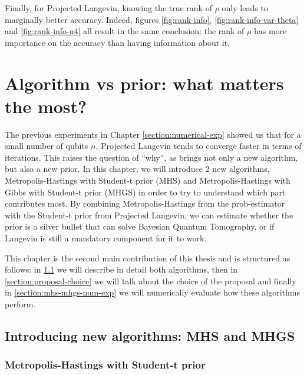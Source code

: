 \documentclass[12pt]{memoir}
\begin{document}
Finally, for Projected Langevin, knowing the true rank of $\rho$ only leads to marginally better accuracy. Indeed, figures \ref{fig:rank-info}, \ref{fig:rank-info-var-theta} and \ref{fig:rank-info-n4} all result in the same conclusion: the rank of $\rho$ has more importance on the accuracy than having information about it.


\chapter{Algorithm vs prior: what matters the most?}\label{section:algo-vs-prior}

The previous experiments in Chapter \ref{section:numerical-exp} showed us that for a small number of qubits $n$, Projected Langevin tends to converge faster in terms of iterations. This raises the question of ``why'', as \cite{meth:bayesian:Langevin:ACMT2024} brings not only a new algorithm, but also a new prior. In this chapter, we will introduce 2 new algorithms, Metropolis-Hastings with Student-t prior (MHS) and Metropolis-Hastings with Gibbs with Student-t prior (MHGS) in order to try to understand which part contributes most. By combining Metropolis-Hastings from the prob-estimator with the Student-t prior from Projected Langevin, we can estimate whether the prior is a silver bullet that can solve Bayesian Quantum Tomography, or if Langevin is still a mandatory component for it to work.\medbreak


This chapter is the second main contribution of this thesis and is structured as follows: in \ref{section:mhs-and-mhgs} we will describe in detail both algorithms, then in \ref{section:proposal-choice} we will talk about the choice of the proposal and finally in \ref{section:mhs-mhgs-num-exp} we will numerically evaluate how these algorithms perform.

\section{Introducing new algorithms: MHS and MHGS}\label{section:mhs-and-mhgs}

\subsection*{Metropolis-Hastings with Student-t prior}
\end{document}
